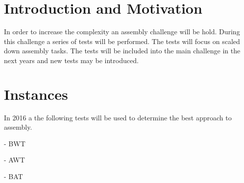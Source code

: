 \section{Introduction and Motivation}
In order to increase the complexity an assembly challenge will be hold. During this challenge a series of tests will be performed. The tests will focus on scaled down assembly tasks. The tests will be included into the main challenge in the next years and new tests may be introduced.








\section{Instances}
In 2016 a the following tests will be used to determine the best approach to assembly.

- BWT

- AWT

- BAT
